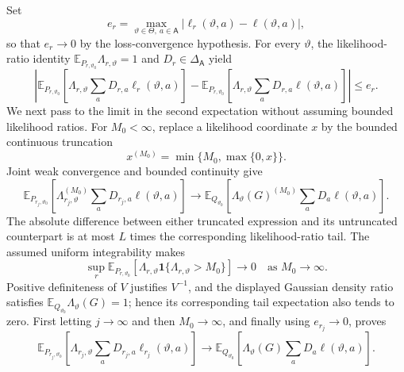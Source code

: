 Set
\[
 e_r=\max_{\vartheta\in\Theta,\ a\in\mathsf A}
 |\ell_r(\vartheta,a)-\ell(\vartheta,a)|,
\]
so that \(e_r\to0\) by the loss-convergence hypothesis. For every \(\vartheta\), the likelihood-ratio identity \(\mathbb E_{P_{r,\vartheta_0}}\Lambda_{r,\vartheta}=1\) and \(D_r\in\Delta_{\mathsf A}\) yield
\[
 \left|
 \mathbb E_{P_{r,\vartheta_0}}\!\left[
  \Lambda_{r,\vartheta}\sum_aD_{r,a}\ell_r(\vartheta,a)
 \right]
 -
 \mathbb E_{P_{r,\vartheta_0}}\!\left[
  \Lambda_{r,\vartheta}\sum_aD_{r,a}\ell(\vartheta,a)
 \right]
 \right|
 \leq e_r.
\]
We next pass to the limit in the second expectation without assuming bounded likelihood ratios. For \(M_0<\infty\), replace a likelihood coordinate \(x\) by the bounded continuous truncation
\[
 x^{(M_0)}=\min\{M_0,\max\{0,x\}\}.
\]
Joint weak convergence and bounded continuity give
\[
 \mathbb E_{P_{r_j,\vartheta_0}}\!\left[
  \Lambda_{r_j,\vartheta}^{(M_0)}
  \sum_aD_{r_j,a}\ell(\vartheta,a)
 \right]
 \longrightarrow
 \mathbb E_{Q_{\vartheta_0}}\!\left[
  \Lambda_\vartheta(G)^{(M_0)}
  \sum_aD_a\ell(\vartheta,a)
 \right].
\]
The absolute difference between either truncated expression and its untruncated counterpart is at most \(L\) times the corresponding likelihood-ratio tail. The assumed uniform integrability makes
\[
 \sup_r\mathbb E_{P_{r,\vartheta_0}}\!\left[
  \Lambda_{r,\vartheta}\mathbf 1\{\Lambda_{r,\vartheta}>M_0\}
 \right]\longrightarrow0
 \quad\text{as }M_0\to\infty.
\]
Positive definiteness of \(V\) justifies \(V^{-1}\), and the displayed Gaussian density ratio satisfies \(\mathbb E_{Q_{\vartheta_0}}\Lambda_\vartheta(G)=1\); hence its corresponding tail expectation also tends to zero. First letting \(j\to\infty\) and then \(M_0\to\infty\), and finally using \(e_{r_j}\to0\), proves
\[
 \mathbb E_{P_{r_j,\vartheta_0}}\!\left[
  \Lambda_{r_j,\vartheta}\sum_aD_{r_j,a}\ell_{r_j}(\vartheta,a)
 \right]
 \longrightarrow
 \mathbb E_{Q_{\vartheta_0}}\!\left[
  \Lambda_\vartheta(G)\sum_aD_a\ell(\vartheta,a)
 \right].
\]

